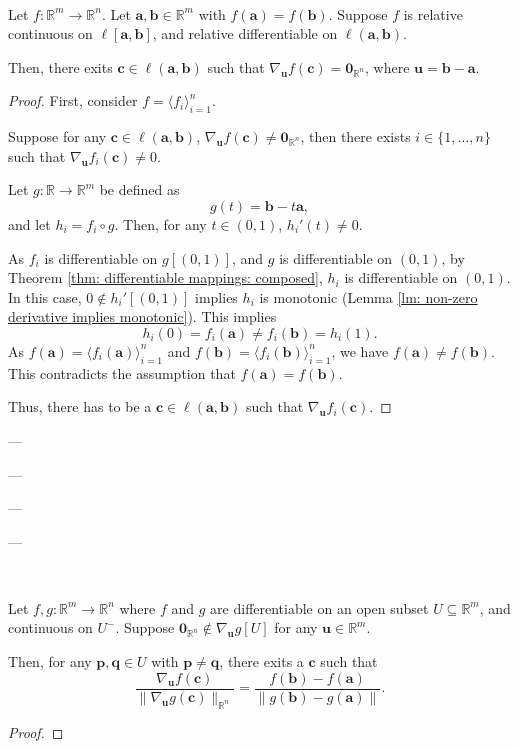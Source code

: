 \begin{lemma}
	 \
	
	Let $f: \mathbb R^m \to \mathbb R^n$. Let $\mathbf a, \mathbf b \in \mathbb R^m$ with $f(\mathbf a) = f(\mathbf b)$. Suppose $f$ is relative continuous on $\ell[\mathbf a, \mathbf b]$, and relative differentiable on $\ell(\mathbf a, \mathbf b)$. 
	
	Then, there exits $\mathbf c \in \ell(\mathbf a, \mathbf b)$ such that $\nabla_{\mathbf u} f(\mathbf c) = \mathbf 0_{\mathbb R^n}$, where $\mathbf u = \mathbf b - \mathbf a$.
	
	\begin{proof}
		First, consider $f = \langle f_i \rangle_{i = 1}^n$.
		
		Suppose for any $\mathbf c \in \ell(\mathbf a, \mathbf b)$, $\nabla_{\mathbf u} f(\mathbf c) \ne \mathbf 0_{\mathbb R^n}$, then there exists $i \in \{1, \ldots, n\}$ such that $\nabla_{\mathbf u}f_i(\mathbf c) \ne 0$.
		
		Let $g: \mathbb R \to \mathbb R^m$ be defined as
		$$
		g(t) = \mathbf b - t\mathbf a,
		$$
		and let $h_i = f_i \circ g$. Then, for any $t \in (0, 1)$, $h_i'(t) \ne 0$.
		
		As $f_i$ is differentiable on $g[(0,1)]$, and $g$ is differentiable on $(0,1)$, by Theorem \ref{thm: differentiable mappings: composed}, $h_i$ is differentiable on $(0,1)$. In this case, $0 \notin h_i'[(0,1)]$ implies $h_i$ is monotonic (Lemma \ref{lm: non-zero derivative implies monotonic}). This implies
		$$
		h_i(0) = f_i(\mathbf a) \ne f_i(\mathbf b) = h_i(1).
		$$
		As $f(\mathbf a) = \langle f_i(\mathbf a) \rangle_{i = 1}^n$ and $f(\mathbf b) = \langle f_i(\mathbf b) \rangle_{i = 1}^n$, we have $f(\mathbf a) \ne f(\mathbf b)$. This contradicts the assumption that $f(\mathbf a) = f(\mathbf b)$.
		
		Thus, there has to be a $\mathbf c \in \ell(\mathbf a, \mathbf b)$ such that $\nabla_{\mathbf u} f_i(\mathbf c)$.
	\end{proof}
\end{lemma}


---

---

---

---


\begin{lemma}
	 \
	
	Let $f, g: \mathbb R^m \to \mathbb R^n$ where $f$ and $g$ are differentiable on an open subset $U \subseteq \mathbb R^m$, and continuous on $U^-$. Suppose $\mathbf 0_{\mathbb R^n} \notin \nabla_{\mathbf u}g[U]$ for any $\mathbf u \in \mathbb R^m$.
	
	Then, for any $\mathbf p, \mathbf q \in U$ with $\mathbf p \ne \mathbf q$, there exits a $\mathbf c$ such that
	$$
	\frac{\nabla_{\mathbf u} f(\mathbf c)}{\| \nabla_{\mathbf u} g(\mathbf c) \|_{\mathbb R^n}} = \frac{f(\mathbf b) - f(\mathbf a)}{\| g(\mathbf b) - g(\mathbf a) \|}.
	$$
	
	\begin{proof}
		
	\end{proof}
\end{lemma}


